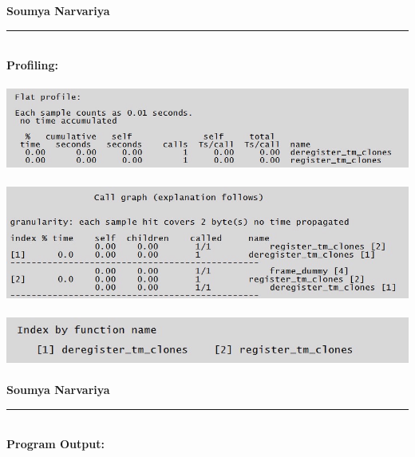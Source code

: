 \documentclass[11pt]{article}
\begin{document}
\textbf{\large{Soumya Narvariya}} \\
\vspace{.5cm}
\rule{18.8cm}{.5mm}  \\
\textbf{\Large Profiling: }\\ \\
\includegraphics[scale=0.5]{pro1.png}\\ \\
\includegraphics[scale=0.5]{pro2.png}\\ \\
\pagebreak
\includegraphics[scale=0.5]{pro3.png}\\ \\
\textbf{\large{Soumya Narvariya}} \\
\vspace{.5cm}
\rule{18.8cm}{.5mm}  \\
\textbf{\Large Program Output: }\\ \\
\end{document}
